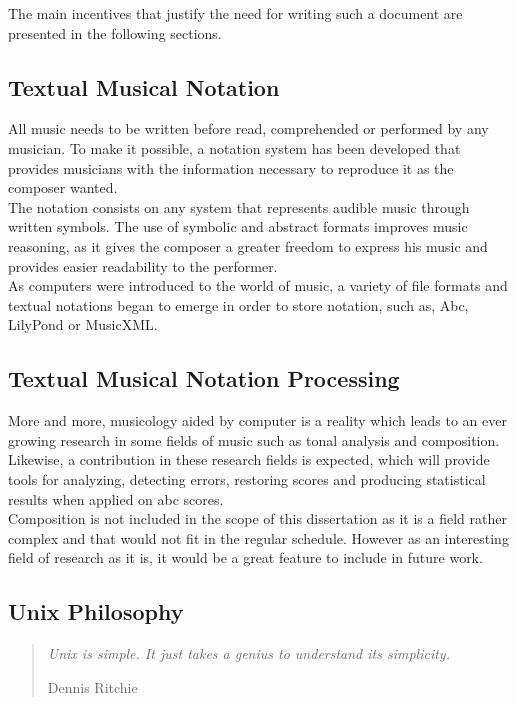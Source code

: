 \documentclass[main.tex]{subfiles}
\begin{document}
The main incentives that justify the need for writing such a document are presented in the following
sections.

\subsection{Textual Musical Notation}

All music needs to be written before read, comprehended or performed by any musician. To make it
possible, a notation system has been developed that provides musicians with the information
necessary to reproduce it as the composer wanted.\\
The notation consists on any system that represents audible music through written symbols. The use
of symbolic and abstract formats improves music reasoning, as it gives the composer a greater
freedom to express his music and provides easier readability to the performer.\\
As computers were introduced to the world of music, a variety of file formats and textual notations
began to emerge in order to store notation, such as, Abc, LilyPond or MusicXML.

\subsection{Textual Musical Notation Processing} 

More and more, musicology aided by computer is a reality which leads to an ever growing research in
some fields of music such as tonal analysis and composition. Likewise, a contribution in these
research fields is expected, which will provide tools for analyzing, detecting errors, restoring
scores and producing statistical results when applied on abc scores.\\
Composition is not included in the scope of this dissertation as it is a field rather complex and
that would not fit in the regular schedule. However as an interesting field of research as it is, it
would be a great feature to include in future work.

\subsection{Unix Philosophy}

\begin{quotation}
  \small\textit{Unix is simple. It just takes a genius to understand its simplicity.}
  \begin{flushright}
    Dennis Ritchie
  \end{flushright}
\end{quotation}
\end{document}
